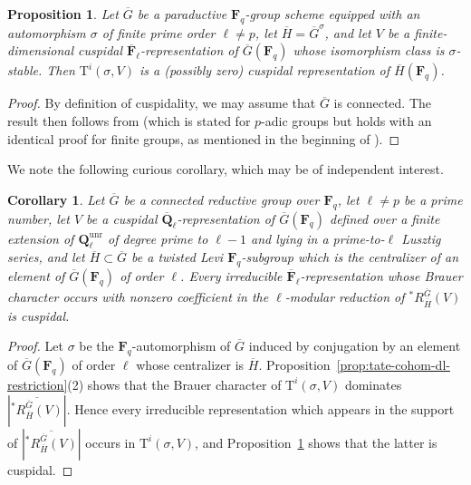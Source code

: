 \documentclass[reqno]{amsart}
\numberwithin{equation}{subsection}
\newcommand{\F}{\mathbf{F}}
\newcommand{\Q}{\mathbf{Q}}
\newcommand{\ol}[1]{\overline{#1}}
\DeclareMathOperator{\unr}{unr}
\newcommand{\rT}{\ensuremath{\mathrm{T}}\xspace}
\newtheorem{prop}[thm]{Proposition}
\newtheorem{cor}[thm]{Corollary}
\theoremstyle{remark}
\numberwithin{equation}{subsection}
\numberwithin{figure}{subsection}
\begin{document}
\begin{prop}\label{prop:tate-cohomology-cuspidal}
    Let $\ol G$ be a paraductive $\F_q$-group scheme equipped with an automorphism $\sigma$ of finite prime order $\ell \neq p$, let $\ol H = \ol G^\sigma$, and let $V$ be a finite-dimensional cuspidal $\ol\F_\ell$-representation of $\ol G(\F_q)$ whose isomorphism class is $\sigma$-stable. Then $\rT^i(\sigma, V)$ is a (possibly zero) cuspidal representation of $\ol H(\F_q)$.
\end{prop}

\begin{proof}
    By definition of cuspidality, we may assume that $\ol G$ is connected. The result then follows from \cite[Corollary~3.3.3]{DN25a} (which is stated for $p$-adic groups but holds with an identical proof for finite groups, as mentioned in the beginning of \cite[\S 3]{DN25a}).
\end{proof}

We note the following curious corollary, which may be of independent interest.

\begin{cor}\label{cor:dl-res-cuspidal}
    Let $\ol G$ be a connected reductive group over $\F_q$, let $\ell \neq p$ be a prime number, let $V$ be a cuspidal $\ol\Q_\ell$-representation of $\ol G(\F_q)$ defined over a finite extension of $\Q_\ell^{\unr}$ of degree prime to $\ell-1$ and lying in a prime-to-$\ell$ Lusztig series, and let $\ol H \subset \ol G$ be a twisted Levi $\F_q$-subgroup which is the centralizer of an element of $\ol G(\F_q)$ of order $\ell$. Every irreducible $\ol\F_\ell$-representation whose Brauer character occurs with nonzero coefficient in the $\ell$-modular reduction of ${}^*R^{\ol G}_{\ol H}(V)$ is cuspidal.
\end{cor}

\begin{proof}
Let $\sigma$ be the $\F_q$-automorphism of $\ol G$ induced by conjugation by an element of $\ol G(\F_q)$ of order $\ell$ whose centralizer is $\ol H$. Proposition~\ref{prop:tate-cohom-dl-restriction}(2) shows that the Brauer character of $\rT^i(\sigma,V)$ dominates $\left|\ol{{}^*R^{\ol G}_{\ol H}(V)}\right|$. Hence every irreducible representation which appears in the support of $\left|\ol{{}^*R^{\ol G}_{\ol H}(V)}\right|$ occurs in $\rT^i(\sigma,V)$, and Proposition~\ref{prop:tate-cohomology-cuspidal} shows that the latter is cuspidal.
\end{proof}
\end{document}
